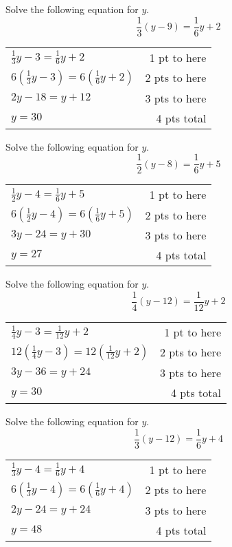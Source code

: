 {
	Solve the following equation for $y$. $$\frac{1}{3}(y-9)=  \frac{1}{6} y+2$$
}
{
	\begin{tabular}{l r}
	$\frac{1}{3}y-3=  \frac{1}{6} y+2$  & 1 pt to here\\
	$6\left(\frac{1}{3}y-3\right)=6 \left( \frac{1}{6} y+2\right)$  & 2 pts to here\\
	$2y-18=y+12$ & 3 pts to here\\
	$y=30$  & 4 pts total
	\end{tabular}
}

{
	Solve the following equation for $y$. $$\frac{1}{2}(y-8)=  \frac{1}{6} y+5$$
}
{
	\begin{tabular}{l r}
	$\frac{1}{2}y-4=  \frac{1}{6} y+5$  & 1 pt to here\\
	$6\left(\frac{1}{2}y-4\right)=6 \left( \frac{1}{6} y+5\right)$  & 2 pts to here\\
	$3y-24=y+30$ & 3 pts to here\\
	$y=27$  & 4 pts total
	\end{tabular}
}

{
	Solve the following equation for $y$. $$\frac{1}{4}(y-12)=  \frac{1}{12} y+2$$
}
{
	\begin{tabular}{l r}
	$\frac{1}{4}y-3=  \frac{1}{12} y+2$  & 1 pt to here\\
	$12\left(\frac{1}{4}y-3\right)=12 \left( \frac{1}{12} y+2\right)$  & 2 pts to here\\
	$3y-36=y+24$ & 3 pts to here\\
	$y=30$  & 4 pts total
	\end{tabular}
}

{
	Solve the following equation for $y$. $$\frac{1}{3}(y-12)=  \frac{1}{6} y+4$$
}
{
	\begin{tabular}{l r}
	$\frac{1}{3}y-4=  \frac{1}{6} y+4$  & 1 pt to here\\
	$6\left(\frac{1}{3}y-4\right)=6 \left( \frac{1}{6} y+4\right)$  & 2 pts to here\\
	$2y-24=y+24$ & 3 pts to here\\
	$y=48$  & 4 pts total
	\end{tabular}
}